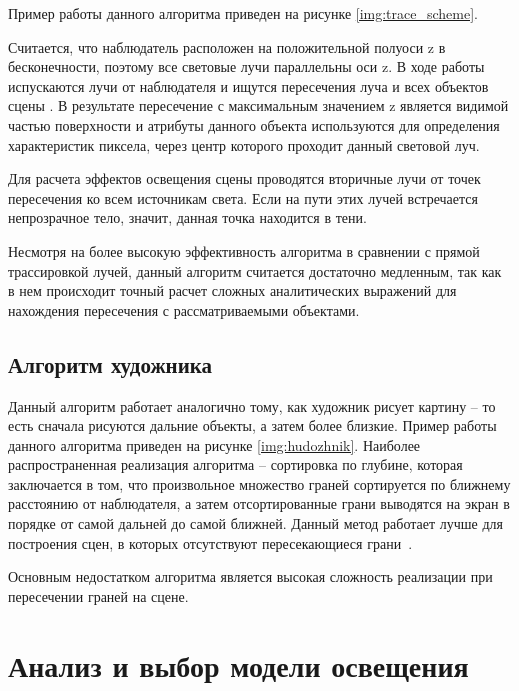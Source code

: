 Пример работы данного алгоритма приведен на рисунке \ref{img:trace_scheme}.


Считается, что наблюдатель расположен на положительной полуоси z в бесконечности, поэтому все световые лучи параллельны оси z. В ходе работы испускаются лучи от наблюдателя и ищутся пересечения луча и всех объектов сцены \cite{bayackovskiy}. В результате пересечение с максимальным значением z является видимой частью поверхности и атрибуты данного объекта используются для определения характеристик пиксела, через центр которого проходит данный световой луч. 

Для расчета эффектов освещения сцены проводятся вторичные лучи от точек пересечения ко всем источникам света. Если на пути этих лучей встречается непрозрачное тело, значит, данная точка находится в тени.

Несмотря на более высокую эффективность алгоритма в сравнении с прямой трассировкой лучей, данный алгоритм считается достаточно медленным, так как в нем происходит точный расчет сложных аналитических выражений для нахождения пересечения с рассматриваемыми объектами.



\subsection{Алгоритм художника}
Данный алгоритм работает аналогично тому, как художник рисует картину – то есть сначала рисуются дальние объекты, а затем более близкие. Пример работы данного алгоритма приведен на рисунке \ref{img:hudozhnik}.  
Наиболее распространенная реализация алгоритма – сортировка по глубине, которая заключается в том, что произвольное множество граней сортируется по ближнему расстоянию от наблюдателя, а затем отсортированные грани выводятся на экран в порядке от самой дальней до самой ближней. Данный метод работает лучше для построения сцен, в которых отсутствуют пересекающиеся грани~\cite{rogers}.

Основным недостатком алгоритма является высокая сложность реализации при пересечении граней на сцене.


\section{Анализ и выбор модели освещения}

